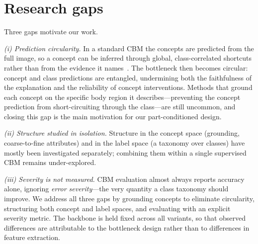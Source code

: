 \section{Research gaps}
\label{sec:research-gaps}
Three gaps motivate our work.

\emph{(i) Prediction circularity.} In a standard CBM the concepts are predicted
from the full image, so a concept can be inferred through global,
class-correlated shortcuts rather than from the evidence it
names~\cite{margeloiu2021concept}. The bottleneck then becomes circular: concept
and class predictions are entangled, undermining both the faithfulness of the
explanation and the reliability of concept interventions. Methods that ground
each concept on the specific body region it describes---preventing the concept
prediction from short-circuiting through the class---are still uncommon, and
closing this gap is the main motivation for our part-conditioned design.

\emph{(ii) Structure studied in isolation.} Structure in the concept space
(grounding, coarse-to-fine attributes) and in the label space (a taxonomy over
classes) have mostly been investigated separately; combining them within a single
supervised CBM remains under-explored.

\emph{(iii) Severity is not measured.} CBM evaluation almost always reports
accuracy alone, ignoring \emph{error severity}---the very quantity a class
taxonomy should improve. We address all three gaps by grounding concepts to
eliminate circularity, structuring both concept and label spaces, and evaluating
with an explicit severity metric. The backbone is held fixed across all
variants, so that observed differences are attributable to the bottleneck design
rather than to differences in feature extraction.
